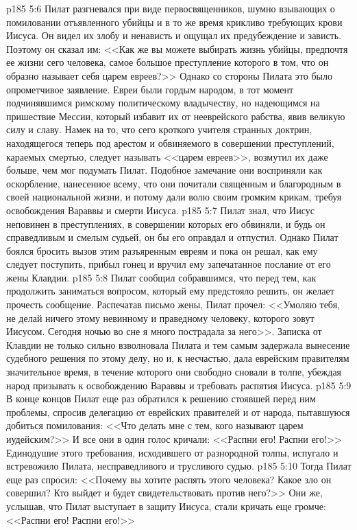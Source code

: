 \vs p185 5:6 Пилат разгневался при виде первосвященников, шумно взывающих о помиловании отъявленного убийцы и в то же время крикливо требующих крови Иисуса. Он видел их злобу и ненависть и ощущал их предубеждение и зависть. Поэтому он сказал им: <<Как же вы можете выбирать жизнь убийцы, предпочтя ее жизни сего человека, самое большое преступление которого в том, что он образно называет себя царем евреев?>> Однако со стороны Пилата это было опрометчивое заявление. Евреи были гордым народом, в тот момент подчинявшимся римскому политическому владычеству, но надеющимся на пришествие Мессии, который избавит их от нееврейского рабства, явив великую силу и славу. Намек на то, что сего кроткого учителя странных доктрин, находящегося теперь под арестом и обвиняемого в совершении преступлений, караемых смертью, следует называть <<царем евреев>>, возмутил их даже больше, чем мог подумать Пилат. Подобное замечание они восприняли как оскорбление, нанесенное всему, что они почитали священным и благородным в своей национальной жизни, и потому дали волю своим громким крикам, требуя освобождения Вараввы и смерти Иисуса.
\vs p185 5:7 Пилат знал, что Иисус неповинен в преступлениях, в совершении которых его обвиняли, и будь он справедливым и смелым судьей, он бы его оправдал и отпустил. Однако Пилат боялся бросить вызов этим разъяренным евреям и пока он решал, как ему следует поступить, прибыл гонец и вручил ему запечатанное послание от его жены Клавдии.
\vs p185 5:8 Пилат сообщил собравшимся, что перед тем, как продолжить заниматься вопросом, который ему предстояло решить, он желает прочесть сообщение. Распечатав письмо жены, Пилат прочел: <<Умоляю тебя, не делай ничего этому невинному и праведному человеку, которого зовут Иисусом. Сегодня ночью во сне я много пострадала за него>>. Записка от Клавдии не только сильно взволновала Пилата и тем самым задержала вынесение судебного решения по этому делу, но и, к несчастью, дала еврейским правителям значительное время, в течение которого они свободно сновали в толпе, убеждая народ призывать к освобождению Вараввы и требовать распятия Иисуса.
\vs p185 5:9 В конце концов Пилат еще раз обратился к решению стоявшей перед ним проблемы, спросив делегацию от еврейских правителей и от народа, пытавшуюся добиться помилования: <<Что делать мне с тем, кого называют царем иудейским?>> И все они в один голос кричали: <<Распни его! Распни его!>> Единодушие этого требования, исходившего от разнородной толпы, испугало и встревожило Пилата, несправедливого и трусливого судью.
\vs p185 5:10 Тогда Пилат еще раз спросил: <<Почему вы хотите распять этого человека? Какое зло он совершил? Кто выйдет и будет свидетельствовать против него?>> Они же, услышав, что Пилат выступает в защиту Иисуса, стали кричать еще громче: <<Распни его! Распни его!>>
